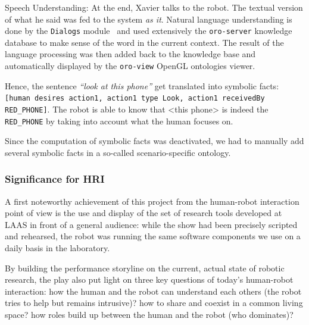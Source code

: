 Speech Understanding: At the end, Xavier talks to the robot. The
textual version of what he said was fed to the system \emph{as it}. Natural
language understanding is done by the {\tt Dialogs}
module~\cite{Lemaignan2011a} and used extensively the {\tt oro-server} knowledge
database to make sense of the word in the current context. The result of the
language processing was then added back to the knowledge base and automatically
displayed by the {\tt oro-view} OpenGL ontologies viewer.

Hence, the sentence \emph{``look at this phone''} get translated into symbolic
facts: {\tt [human desires action1, action1 type Look, action1 receivedBy
RED\_PHONE]}. The robot is able to know that <this phone> is indeed the {\tt
RED\_PHONE} by taking into account what the human focuses on.

Since the computation of symbolic facts was deactivated, we had to manually add
several symbolic facts in a so-called scenario-specific ontology.

\subsubsection{Significance for HRI}

A first noteworthy achievement of this project from the human-robot
interaction point of view is the use and display of the set of research tools
developed at LAAS in front of a general audience: while the show had been
precisely scripted and rehearsed, the robot was running the same software
components we use on a daily basis in the laboratory.

By building the performance storyline on the current, actual state of robotic
research,  the play also put light on three key questions of today's
human-robot interaction: how the human and the robot can understand each others
(the robot tries to help but remains intrusive)? how to share and coexist in a
common living space? how roles build up between the human and the robot (who
dominates)?

